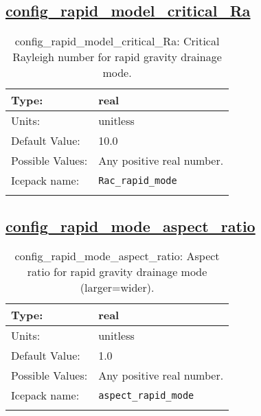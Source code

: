 \subsection[config\_rapid\_model\_critical\_Ra]{\hyperref[sec:nm_tab_thermodynamics]{config\_rapid\_model\_critical\_Ra}}
\label{subsec:nm_sec_config_rapid_model_critical_Ra}
\begin{center}
\begin{longtable}{| p{2.0in} || p{4.0in} |}
    \hline
    Type: & real \\
    \hline
    Units: & \si{unitless} \\
    \hline
    Default Value: & 10.0 \\
    \hline
    Possible Values: & Any positive real number. \\
    \hline
    \hline
    Icepack name: & \verb+Rac_rapid_mode+ \\
    \caption{config\_rapid\_model\_critical\_Ra: Critical Rayleigh number for rapid gravity drainage mode.}
\end{longtable}
\end{center}
\subsection[config\_rapid\_mode\_aspect\_ratio]{\hyperref[sec:nm_tab_thermodynamics]{config\_rapid\_mode\_aspect\_ratio}}
\label{subsec:nm_sec_config_rapid_mode_aspect_ratio}
\begin{center}
\begin{longtable}{| p{2.0in} || p{4.0in} |}
    \hline
    Type: & real \\
    \hline
    Units: & \si{unitless} \\
    \hline
    Default Value: & 1.0 \\
    \hline
    Possible Values: & Any positive real number. \\
    \hline
    \hline
    Icepack name: & \verb+aspect_rapid_mode+ \\
    \caption{config\_rapid\_mode\_aspect\_ratio: Aspect ratio for rapid gravity drainage mode (larger=wider).}
\end{longtable}
\end{center}
